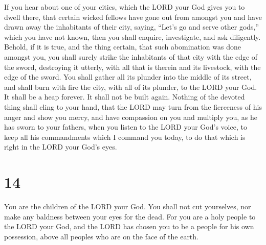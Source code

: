 If you hear about one of your cities, which the LORD
your God gives you to dwell there, that  certain wicked
fellows have gone out from amongst you and have drawn away the
inhabitants of their city, saying, ``Let's go and serve other gods,''
which you have not known,  then you shall enquire,
investigate, and ask diligently. Behold, if it is true, and the thing
certain, that such abomination was done amongst you,  you
shall surely strike the inhabitants of that city with the edge of the
sword, destroying it utterly, with all that is therein and its
livestock, with the edge of the sword.  You shall gather
all its plunder into the middle of its street, and shall burn with fire
the city, with all of its plunder, to the LORD your God. It shall be a
heap forever. It shall not be built again.  Nothing of
the devoted thing shall cling to your hand, that the LORD may turn from
the fierceness of his anger and show you mercy, and have compassion on
you and multiply you, as he has sworn to your fathers, 
when you listen to the LORD your God's voice, to keep all his
commandments which I command you today, to do that which is right in the
LORD your God's eyes.

\hypertarget{section-13}{%
\section{14}\label{section-13}}

 You are the children of the LORD your God. You shall not
cut yourselves, nor make any baldness between your eyes for the dead.
 For you are a holy people to the LORD your God, and the
LORD has chosen you to be a people for his own possession, above all
peoples who are on the face of the earth.

